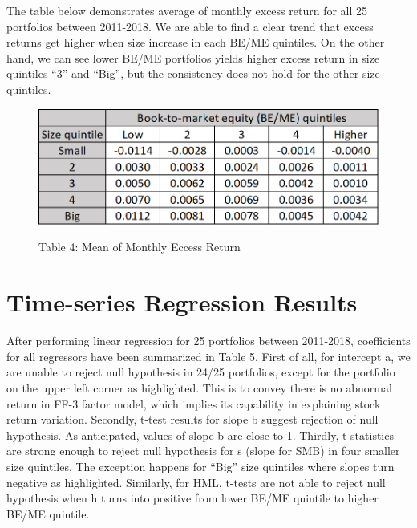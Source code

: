 \documentclass[12pt]{article}
\begin{document}
\noindent The table below demonstrates average of monthly excess return for all 25 portfolios between 2011-2018. We are able to find a clear trend that excess returns get higher when size increase in each BE/ME quintiles. On the other hand, we can see lower BE/ME portfolios yields higher excess return in size quintiles “3” and “Big”, but the consistency does not hold for the other size quintiles. 

\begin{figure}[h]
	\centering
	\caption*{Table 4: Mean of Monthly Eccess Return}
	\includegraphics[width=0.55\linewidth]{A4.png}
	\label{fig:label}
\end{figure}

\section{Time-series Regression Results}


After performing linear regression for 25 portfolios between 2011-2018, coefficients for all regressors have been summarized in Table 5. First of all, for intercept a, we are unable to reject null hypothesis in 24/25 portfolios, except for the portfolio on the upper left corner as highlighted. This is to convey there is no abnormal return in FF-3 factor model, which implies its capability in explaining stock return variation. Secondly, t-test results for slope b suggest rejection of null hypothesis. As anticipated, values of slope b are close to 1. Thirdly, t-statistics are strong enough to reject null hypothesis for s (slope for SMB) in four smaller size quintiles. The exception happens for “Big” size quintiles where slopes turn negative as highlighted. Similarly, for HML, t-tests are not able to reject null hypothesis when h turns into positive from lower BE/ME quintile to higher BE/ME quintile.
\end{document}
